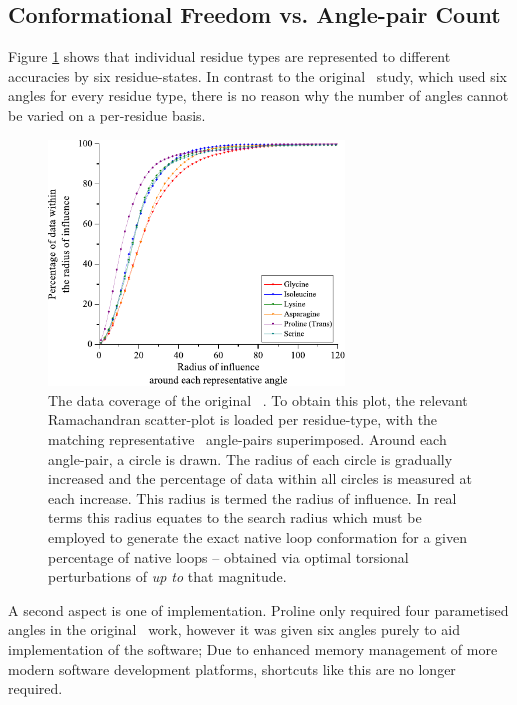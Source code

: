 \subsection{Conformational Freedom vs. Angle-pair Count}

Figure \ref{fig:reducedrep:angle_coverage} shows that individual residue types are represented to different accuracies by six residue-states.
 In contrast to the original \raft\ study, which used six angles for every residue type, there is no reason why the number of angles cannot be varied on a per-residue basis. 
\begin{figure}[hbtp]
\begin{center}
\includegraphics[width=0.7\textwidth]{05-ReducedRep/closest_angle/closest.pdf}
\caption[The data coverage of the original \raft\ \angleset.]{The data coverage of the original \raft\ \angleset. To obtain this plot, the relevant Ramachandran scatter-plot  is loaded per residue-type, with the matching representative \raft\ angle-pairs superimposed. Around each angle-pair, a circle is drawn. The radius of each circle is gradually increased and the percentage of data within all circles is measured at each increase. This radius is termed the radius of influence. In real terms this radius equates to the search radius which must be employed to generate the exact native loop conformation for a given percentage of native loops -- obtained via optimal torsional perturbations of \emph{up to} that magnitude.}
\label{fig:reducedrep:angle_coverage}
\end{center}
\end{figure}

A second aspect is one of implementation. Proline only required four parametised angles in the original \raft\ work, however it was given six angles purely to aid implementation of the software; Due to enhanced memory management of more modern software development platforms, shortcuts like this are no longer required. 

